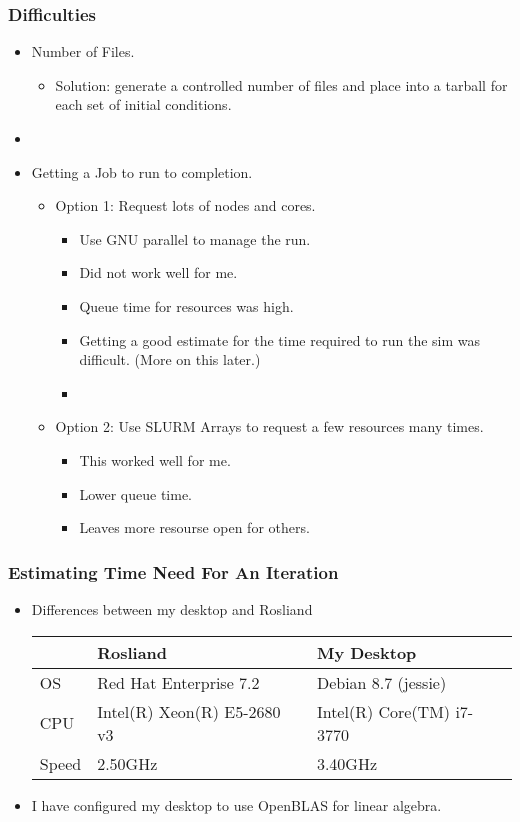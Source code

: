 \documentclass[10pt]{beamer}
\begin{document}
\begin{frame}[t]
  \frametitle{Difficulties}
  \begin{itemize}
    \item Number of Files.
      \begin{itemize} 
        \item Solution: generate a controlled number of files and place into a
          tarball for each set of initial conditions.
      \end{itemize}

    \item[]

    \item Getting a Job to run to completion.
      \begin{itemize}
        \item Option 1: Request lots of nodes and cores.
          \begin{itemize}
            \item Use GNU parallel to manage the run.
            \item Did not work well for me.
            \item Queue time for resources was high.
            \item Getting a good estimate for the time required to run the sim
              was difficult. (More on this later.)
            \item[]
          \end{itemize}
        \item Option 2: Use SLURM Arrays to request a few resources many times.
          \begin{itemize}
            \item This worked well for me.
            \item Lower queue time.
            \item Leaves more resourse open for others.
          \end{itemize}
      \end{itemize}
  \end{itemize}
\end{frame}

\begin{frame}[t]
  \frametitle{Estimating Time Need For An Iteration}
  \small
  \begin{itemize}
    \item Differences between my desktop and Rosliand
      \begin{tabular}{p{0.75in}ll}
            & Rosliand                                  & My Desktop \\ \hline
        OS  & Red Hat Enterprise 7.2                    & Debian 8.7 (jessie) \\
        CPU & Intel(R) Xeon(R) E5-2680 v3 & Intel(R) Core(TM) i7-3770 \\
        Speed & 2.50GHz & 3.40GHz \\ \hline
      \end{tabular} 

    \item I have configured my desktop to use OpenBLAS for linear algebra.
  \end{itemize}
\end{frame}
\end{document}
